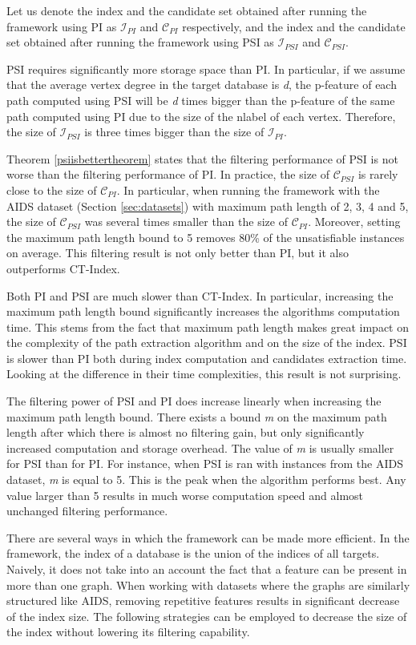 \documentclass{l4proj}
\newcommand{\fancyI}{\mathcal{I}}
\newcommand{\fancyC}{\mathcal{C}}
\begin{document}
Let us denote the index and the candidate set obtained after running the framework using PI as $\fancyI_{PI}$ and $\fancyC_{PI}$ respectively, and the index and the candidate set obtained after running the framework using PSI as $\fancyI_{PSI}$ and $\fancyC_{PSI}$. 

PSI requires significantly more storage space than PI. In particular, if we assume that the average vertex degree in the target database is \emph{d}, the p-feature of each path computed using PSI will be \emph{d} times bigger than the p-feature of the same path computed using PI due to the size of the nlabel of each vertex. Therefore, the size of $\fancyI_{PSI}$ is three times bigger than the size of $\fancyI_{PI}$.

Theorem \ref{psiisbettertheorem} states that the filtering performance of PSI is not worse than the filtering performance of PI. In practice, the size of $\fancyC_{PSI}$ is rarely close to the size of $\fancyC_{PI}$. In particular, when running the framework with the AIDS dataset (Section \ref{sec:datasets}) with maximum path length of 2, 3, 4 and 5, the size of $\fancyC_{PSI}$ was several times smaller than the size of $\fancyC_{PI}$. Moreover, setting the maximum path length bound to 5 removes 80\% of the unsatisfiable instances on average. This filtering result is not only better than PI, but it also outperforms CT-Index.

Both PI and PSI are much slower than CT-Index. In particular, increasing the maximum path length bound significantly increases the algorithms computation time. This stems from the fact that maximum path length makes great impact on the complexity of the path extraction algorithm and on the size of the index. PSI is slower than PI both during index computation and candidates extraction time. Looking at the difference in their time complexities, this result is not surprising.

The filtering power of PSI and PI does increase linearly when increasing the maximum path length bound. There exists a bound \emph{m} on the maximum path length after which there is almost no filtering gain, but only significantly increased computation and storage overhead. The value of \emph{m} is usually smaller for PSI than for PI. For instance, when PSI is ran with instances from the AIDS dataset, \emph{m} is equal to 5. This is the peak when the algorithm performs best. Any value larger than 5 results in much worse computation speed and almost unchanged filtering performance.

There are several ways in which the framework can be made more efficient. In the framework, the index of a database is the union of the indices of all targets. Naively, it does not take into an account the fact that a feature can be present in more than one graph. When working with datasets where the graphs are similarly structured like AIDS, removing repetitive features results in significant decrease of the index size. The following strategies can be employed to decrease the size of the index without lowering its filtering capability.
\end{document}
